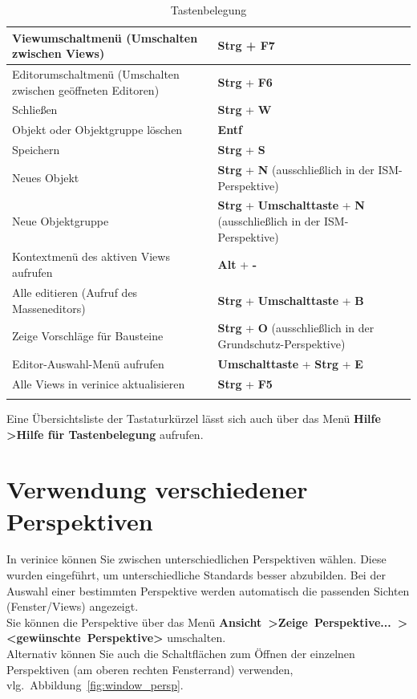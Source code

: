 \documentclass[a4paper,10pt]{book}
\begin{document}
\begin{longtable}{| p{} | p{} |}
Viewumschaltmenü (Umschalten zwischen Views) & \textbf{Strg} + \textbf{F7} \\[10pt] \hline
Editorumschaltmenü (Umschalten zwischen geöffneten Editoren) & \textbf{Strg} + \textbf{F6} \\[10pt] \hline
Schließen & \textbf{Strg} + \textbf{W} \\[10pt] \hline
Objekt oder Objektgruppe löschen & \textbf{Entf} \\[10pt] \hline
Speichern & \textbf{Strg} + \textbf{S} \\[10pt] \hline
Neues Objekt & \textbf{Strg} + \textbf{N} (ausschließlich in der ISM-Perspektive) \\[10pt] \hline
Neue Objektgruppe & \textbf{Strg} + \textbf{Umschalttaste} + \textbf{N} (ausschließlich in der ISM-Perspektive) \\[10pt] \hline
Kontextmenü des aktiven Views aufrufen & \textbf{Alt} + \textbf{-} \\[10pt] \hline
Alle editieren (Aufruf des Masseneditors) & \textbf{Strg} + \textbf{Umschalttaste} + \textbf{B} \\[10pt] \hline
Zeige Vorschläge für Bausteine & \textbf{Strg} + \textbf{O} (ausschließlich in der Grundschutz-Perspektive)  \\[10pt] \hline
Editor-Auswahl-Menü aufrufen & \textbf{Umschalttaste} + \textbf{Strg} + \textbf{E} \\[10pt] \hline
Alle Views in verinice aktualisieren & \textbf{Strg} + \textbf{F5} \\[10pt] \hline
\caption{Tastenbelegung}
\end{longtable}
Eine Übersichtsliste der Tastaturkürzel lässt sich auch über das Menü
\textbf{Hilfe \textgreater Hilfe für Tastenbelegung} aufrufen.

\section{Verwendung verschiedener Perspektiven} \label{Verwendung verschiedener Perspektiven}
In verinice können Sie zwischen unterschiedlichen Perspektiven wählen. Diese wurden eingeführt, um unterschiedliche Standards besser
abzubilden. Bei der Auswahl einer bestimmten Perspektive werden automatisch die passenden Sichten (Fenster/Views) angezeigt.
\newline \\
Sie können die Perspektive über das Menü
\newline\mbox{\textbf{Ansicht \textgreater Zeige Perspektive... \textgreater \textless gewünschte Perspektive\textgreater}} umschalten.
\newline \\
Alternativ können Sie auch die Schaltflächen zum Öffnen der einzelnen Perspektiven (am oberen rechten Fensterrand) verwenden,
vlg.\ Abbildung~\ref{fig:window_persp}.
\end{document}
